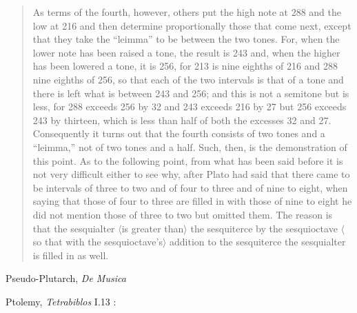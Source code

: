\documentclass{amsart}
\theoremstyle{definition}
\begin{document}
\begin{quote}
As terms of the fourth, however, others put the high note at 288 and the low at 216 and then determine proportionally those that come next, except that they take the ``leimma'' to be
 between the two tones. For, when the lower note has been raised a tone, the result is 243 and, when the higher has been lowered a tone, it is 256, for 213 is nine eighths of 216 and
 288 nine eighths of 256, so that each of the two intervals is that of a tone and there is left what is between 243 and 256; and this is not a semitone but
is less, for 288 exceeds 256 by 32 and 243 exceeds 216 by 27 but 256 exceeds 243 by thirteen, which is less than half of both the excesses 32 and 27. Consequently it turns out
that the fourth consists of two tones and a ``leimma,'' not of two tones and a half. Such, then, is the demonstration of this point. As to the following point, from what has been said
before it is not very difficult either to see why, after Plato had said that there came to be intervals of three to two and of four to three and of nine to eight, when saying that those of four
to three are filled in with those of nine to eight he did not mention those of three to two but omitted them. The reason is that the sesquialter {$\langle$}is greater than{$\rangle$} the 
sesquiterce by the sesquioctave {$\langle$}so that with the sesquioctave's{$\rangle$} addition to the sesquiterce the sesquialter is filled in as well.
\end{quote}

Pseudo-Plutarch, {\em De Musica} \cite{LCL428}

Ptolemy, {\em Tetrabiblos} I.13 \cite{LCL435}:
\end{document}
